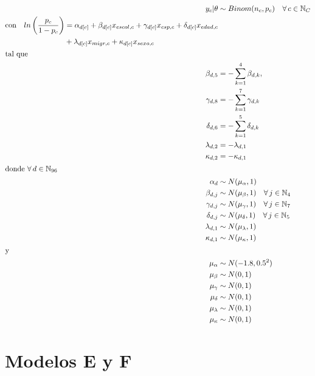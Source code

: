 \begin{align}\label{eq:Modelo_Comp_D}
y_c|\theta & \sim Binom(n_c,p_c) \quad \forall \, c \in \mathbb{N}_C \nonumber \\
\begin{split}
\text{con} \quad ln\left(\dfrac{p_c}{1-p_c}\right) &= \alpha_{d[c]} + \beta_{d[c]} x_{escol,c} + \gamma_{d[c]} x_{csp,c} + \delta_{d[c]} x_{edad,c} \\
&+ \lambda_{d[c]} x_{migr,c} + \kappa_{d[c]} x_{sexo,c} 
\end{split}\\
\intertext{tal que} 
\beta_{d,5} &= -\sum\limits_{k = 1}^{4} \beta_{d,k}, \nonumber \\
\gamma_{d,8} &= -\sum\limits_{k = 1}^{7} \gamma_{d,k} \nonumber \\
\delta_{d,6} &= -\sum\limits_{k = 1}^{5} \delta_{d,k} \nonumber \\
\lambda_{d,2} &= -\lambda_{d,1} \nonumber \\
\kappa_{d,2} &= -\kappa_{d,1} \nonumber \\
\intertext{donde $\forall \, d \in \mathbb{N}_{96}$}
\alpha_d & \sim N(\mu_{\alpha}, 1) \quad  \nonumber \\
\beta_{d,j} & \sim N(\mu_{\beta}, 1) \quad \forall \, j \in \mathbb{N}_{4} \nonumber \\
\gamma_{d,j} & \sim N(\mu_{\gamma}, 1) \quad \forall \, j \in \mathbb{N}_{7} \nonumber \\
\delta_{d,j} & \sim N(\mu_{\delta}, 1) \quad \forall \, j \in \mathbb{N}_{5} \nonumber \\
\lambda_{d,1} & \sim N(\mu_{\lambda}, 1) \nonumber \\
\kappa_{d,1} & \sim N(\mu_{\kappa}, 1) \nonumber \\
\intertext{y}
\mu_{\alpha} &\sim N(-1.8,0.5^2) \nonumber \\
\mu_{\beta} &\sim N(0,1) \nonumber \\
\mu_{\gamma} &\sim N(0,1) \nonumber \\
\mu_{\delta} &\sim N(0,1) \nonumber \\
\mu_{\lambda} &\sim N(0,1) \nonumber \\
\mu_{\kappa} &\sim N(0,1) \nonumber
\end{align}

\section*{Modelos E y F}

